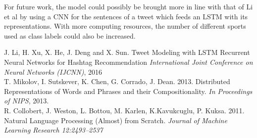 \documentclass[journal, a4paper]{IEEEtran}
\begin{document}
For future work, the model could possibly be brought more in line with that of Li et al \cite{Li-lstm} by using a CNN for the sentences of a tweet which feeds an LSTM with its representations. With more computing resources, the number of different sports used as class labels could also be increased.

\begin{thebibliography}{5}

	J. Li, H. Xu, X. He, J. Deng and X. Sun. Tweet Modeling with LSTM Recurrent Neural
	Networks for Hashtag Recommendation {\em International Joint Conference on Neural Networks (IJCNN)}, 2016\\

	T. Mikolov, I. Sutskever, K. Chen, G. Corrado, J. Dean. 2013. Distributed Representations of Words and Phrases and their Compositionality. {\em In Proceedings of NIPS}, 2013.\\

	R. Collobert, J. Weston, L. Bottou, M. Karlen, K.Kavukcuglu, P. Kuksa. 2011. Natural Language Processing (Almost) from Scratch. {\em Journal of Machine Learning Research 12:2493–2537}\\
\end{thebibliography}

\end{document}
